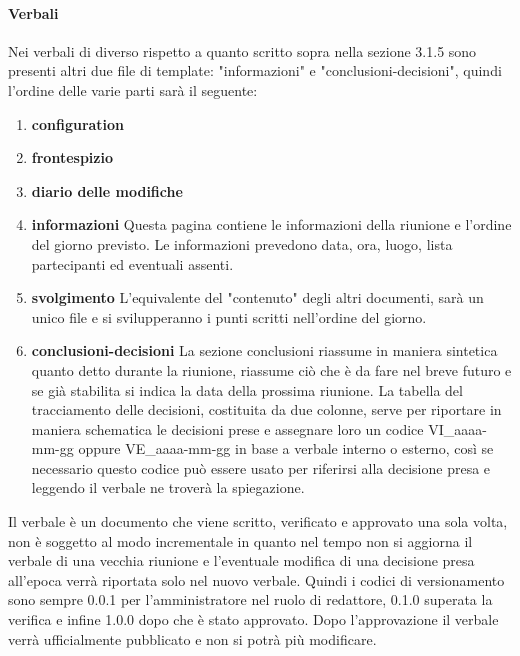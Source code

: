 \paragraph{Verbali}
Nei verbali di diverso rispetto a quanto scritto sopra nella sezione 3.1.5 
sono presenti altri due file di template: "informazioni" e "conclusioni-decisioni", 
quindi l'ordine delle varie parti sarà il seguente:
\begin{enumerate}
        \item \textbf{configuration}
        \item \textbf{frontespizio}
        \item \textbf{diario delle modifiche}
        \item \textbf{informazioni}
                Questa pagina contiene le informazioni della riunione e l'ordine del giorno previsto.
                Le informazioni prevedono data, ora, luogo, lista partecipanti ed eventuali assenti.
        \item \textbf{svolgimento}
                L'equivalente del "contenuto" degli altri documenti, sarà un unico file e si 
                svilupperanno i punti scritti nell'ordine del giorno.
        \item \textbf{conclusioni-decisioni}
                La sezione conclusioni riassume in maniera sintetica quanto detto durante la riunione, 
                riassume ciò che è da fare nel breve futuro e se già stabilita si indica la data 
                della prossima riunione. \newline
                La tabella del tracciamento delle decisioni, costituita da due colonne, serve per 
                riportare in maniera schematica le decisioni prese e assegnare loro un codice 
                VI\_aaaa-mm-gg oppure VE\_aaaa-mm-gg in base a verbale interno o esterno, così 
                se necessario questo codice può essere usato per riferirsi alla decisione presa 
                e leggendo il verbale ne troverà la spiegazione.
\end{enumerate}
Il verbale è un documento che viene scritto, verificato e approvato una sola volta, 
non è soggetto al modo incrementale in quanto nel tempo non si aggiorna il verbale 
di una vecchia riunione e l'eventuale modifica di una decisione presa all'epoca verrà 
riportata solo nel nuovo verbale. Quindi i codici di versionamento sono sempre 0.0.1 
per l'amministratore nel ruolo di redattore, 0.1.0 superata la verifica e infine 1.0.0 
dopo che è stato approvato. Dopo l'approvazione il verbale verrà ufficialmente pubblicato 
e non si potrà più modificare.

